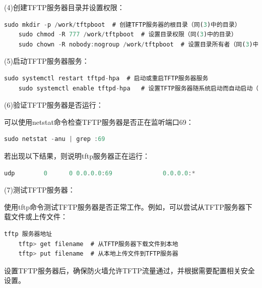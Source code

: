      (4)创建TFTP服务器目录并设置权限：
    
    \begin{lstlisting}[language=rust]
    sudo mkdir -p /work/tftpboot  # 创建TFTP服务器的根目录（同(3)中的目录）
    sudo chmod -R 777 /work/tftpboot  # 设置目录权限（同(3)中的目录）
    sudo chown -R nobody:nogroup /work/tftpboot  # 设置目录所有者（同(3)中的目录）
    \end{lstlisting}
    
    (5)启动TFTP服务器服务：
    
     \begin{lstlisting}[language=rust]
    sudo systemctl restart tftpd-hpa  # 启动或重启TFTP服务器服务
    sudo systemctl enable tftpd-hpa   # 设置TFTP服务器随系统启动而自动启动（可选）	
     \end{lstlisting}
    
    (6)验证TFTP服务器是否运行：
    
    可以使用netstat命令检查TFTP服务器是否正在监听端口69：
    
    \begin{lstlisting}[language=rust]
    sudo netstat -anu | grep :69
    \end{lstlisting}
    
    若出现以下结果，则说明tftp服务器正在运行：
    
    \begin{lstlisting}[language=rust]
    udp        0      0 0.0.0.0:69              0.0.0.0:* 
    \end{lstlisting}
    
    (7)测试TFTP服务器：
    
    使用tftp命令测试TFTP服务器是否正常工作。例如，可以尝试从TFTP服务器下载文件或上传文件：
    
    \begin{lstlisting}[language=rust]
	tftp 服务器地址
	tftp> get filename  # 从TFTP服务器下载文件到本地
	tftp> put filename  # 从本地上传文件到TFTP服务器
    \end{lstlisting}
    
    设置TFTP服务器后，确保防火墙允许TFTP流量通过，并根据需要配置相关安全设置。
